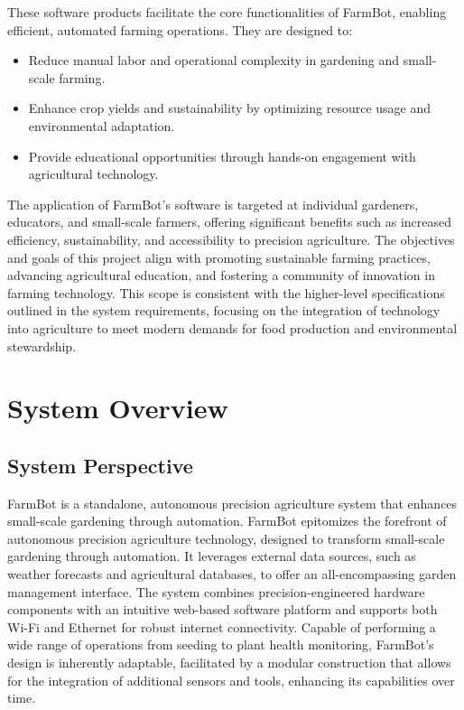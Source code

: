 These software products facilitate the core functionalities of FarmBot, enabling efficient, automated farming operations. They are designed to:

\begin{itemize}
    \item Reduce manual labor and operational complexity in gardening and small-scale farming.
    \item Enhance crop yields and sustainability by optimizing resource usage and environmental adaptation.
    \item Provide educational opportunities through hands-on engagement with agricultural technology.
\end{itemize}

The application of FarmBot's software is targeted at individual gardeners, educators, and small-scale farmers, offering significant benefits such as increased efficiency, sustainability, and accessibility to precision agriculture. The objectives and goals of this project align with promoting sustainable farming practices, advancing agricultural education, and fostering a community of innovation in farming technology. This scope is consistent with the higher-level specifications outlined in the system requirements, focusing on the integration of technology into agriculture to meet modern demands for food production and environmental stewardship.

\section{System Overview}
\subsection{System Perspective}
FarmBot is a standalone, autonomous precision agriculture system that enhances small-scale gardening through automation. FarmBot epitomizes the forefront of autonomous precision agriculture technology, designed to transform small-scale gardening through automation. It leverages external data sources, such as weather forecasts and agricultural databases, to offer an all-encompassing garden management interface. The system combines precision-engineered hardware components with an intuitive web-based software platform and supports both Wi-Fi and Ethernet for robust internet connectivity. Capable of performing a wide range of operations from seeding to plant health monitoring, FarmBot's design is inherently adaptable, facilitated by a modular construction that allows for the integration of additional sensors and tools, enhancing its capabilities over time.

